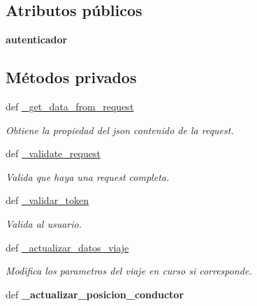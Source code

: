 \subsection*{Atributos públicos}
\begin{DoxyCompactItemize}
\item 
\hypertarget{classsrc_1_1resources_1_1driver_modificar_posicion_1_1_conductor_modificar_posicion_a2c579ca60058f1ba721ee7a06390e094}{{\bfseries autenticador}}\label{classsrc_1_1resources_1_1driver_modificar_posicion_1_1_conductor_modificar_posicion_a2c579ca60058f1ba721ee7a06390e094}

\end{DoxyCompactItemize}
\subsection*{Métodos privados}
\begin{DoxyCompactItemize}
\item 
def \hyperlink{classsrc_1_1resources_1_1driver_modificar_posicion_1_1_conductor_modificar_posicion_aeb0a85b50e4dff9aadf447c18e047927}{\-\_\-get\-\_\-data\-\_\-from\-\_\-request}
\begin{DoxyCompactList}\small\item\em Obtiene la propiedad del json contenido de la request. \end{DoxyCompactList}\item 
def \hyperlink{classsrc_1_1resources_1_1driver_modificar_posicion_1_1_conductor_modificar_posicion_ab108939cbeb442ef668b9e9a3f73256b}{\-\_\-validate\-\_\-request}
\begin{DoxyCompactList}\small\item\em Valida que haya una request completa. \end{DoxyCompactList}\item 
def \hyperlink{classsrc_1_1resources_1_1driver_modificar_posicion_1_1_conductor_modificar_posicion_ac748fc1e6dadb7fb7c12e21bc83d9bfa}{\-\_\-validar\-\_\-token}
\begin{DoxyCompactList}\small\item\em Valida al usuario. \end{DoxyCompactList}\item 
def \hyperlink{classsrc_1_1resources_1_1driver_modificar_posicion_1_1_conductor_modificar_posicion_afef21f0ec8f37cda7789bcf231949ed5}{\-\_\-actualizar\-\_\-datos\-\_\-viaje}
\begin{DoxyCompactList}\small\item\em Modifica los parametros del viaje en curso si corresponde. \end{DoxyCompactList}\item 
\hypertarget{classsrc_1_1resources_1_1driver_modificar_posicion_1_1_conductor_modificar_posicion_a41f849ecba78284f88af9c50546d59b1}{def {\bfseries \-\_\-actualizar\-\_\-posicion\-\_\-conductor}}\label{classsrc_1_1resources_1_1driver_modificar_posicion_1_1_conductor_modificar_posicion_a41f849ecba78284f88af9c50546d59b1}

\end{DoxyCompactItemize}


